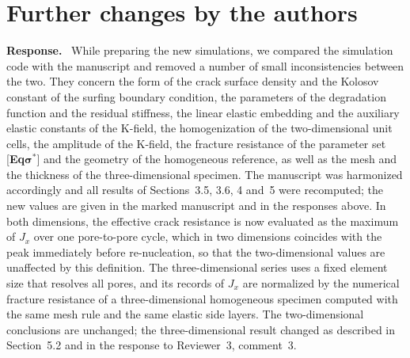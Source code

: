 \documentclass[pdflatex,sn-mathphys-num]{sn-jnl}
\newcommand{\EqSigmaStarLabel}{[\textbf{Eq$\boldsymbol{\sigma^*}$}]\xspace}
\newenvironment{response}
  {\par\noindent\textbf{Response.}\ }
  {\par}
\begin{document}
\section*{Further changes by the authors}

\begin{response}
While preparing the new simulations, we compared the simulation code with the manuscript and removed a number of
small inconsistencies between the two. They concern the form of the crack surface density and the Kolosov constant
of the surfing boundary condition, the parameters of the degradation function and the residual stiffness, the linear
elastic embedding and the auxiliary elastic constants of the K-field, the homogenization of the two-dimensional unit
cells, the amplitude of the K-field, the fracture resistance of the parameter set \EqSigmaStarLabel{} and the geometry
of the homogeneous reference, as well as the mesh and the thickness of the three-dimensional specimen. The manuscript
was harmonized accordingly and all results of Sections~3.5, 3.6, 4 and~5 were recomputed; the new values are given in
the marked manuscript and in the responses above. In both dimensions, the effective crack resistance is now evaluated
as the maximum of $J_x$ over one pore-to-pore cycle, which in two dimensions coincides with the peak immediately before
re-nucleation, so that the two-dimensional values are unaffected by this definition. The three-dimensional series uses
a fixed element size that resolves all pores, and its records of $J_x$ are normalized by the numerical fracture
resistance of a three-dimensional homogeneous specimen computed with the same mesh rule and the same elastic side layers. The two-dimensional
conclusions are unchanged; the three-dimensional result changed as described in Section~5.2 and in the response to
Reviewer~3, comment~3.
\end{response}
\end{document}
